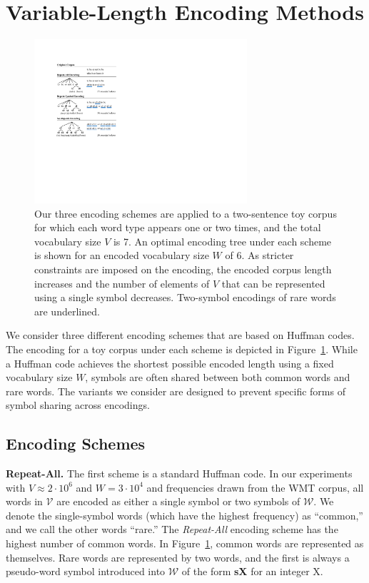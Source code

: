 \section{Variable-Length Encoding Methods}
\label{sec:encoding}

\begin{figure}
\includegraphics[width=3.1in]{images/examples}
\caption{Our three encoding schemes are applied to a two-sentence toy corpus
for which each word type appears one or two times, and the total vocabulary
size $V$ is 7. An optimal encoding tree under each scheme is shown for an
encoded vocabulary size $W$ of 6. As stricter constraints are imposed on the
encoding, the encoded corpus length increases and the number of elements of $V$
that can be represented using a single symbol decreases. Two-symbol encodings
of rare words are underlined.}
\label{fig:examples}
\end{figure}

We consider three different encoding schemes that are based on Huffman codes.
The encoding for a toy corpus under each scheme is depicted in
Figure~\ref{fig:examples}. While a Huffman code achieves the shortest possible
encoded length using a fixed vocabulary size $W$, symbols are often shared
between both common words and rare words. The variants we
consider are designed to prevent specific forms of symbol sharing across encodings.

\subsection{Encoding Schemes}

\noindent\textbf{Repeat-All.}
The first scheme is a standard Huffman code. In our experiments with
$V\approx2\cdot10^6$ and $W=3\cdot10^4$ and frequencies drawn from the WMT
corpus, all words in $\mathcal{V}$ are encoded as either a single symbol or two
symbols of $\mathcal{W}$. We denote the single-symbol words (which have the
highest frequency) as ``common,'' and we call the other words ``rare.'' The
\emph{Repeat-All} encoding scheme has the highest number of common words. In
Figure~\ref{fig:examples}, common words are represented as themselves. Rare
words are represented by two words, and the first is always a pseudo-word
symbol introduced into $\mathcal{W}$ of the form \textbf{sX} for an integer X.

